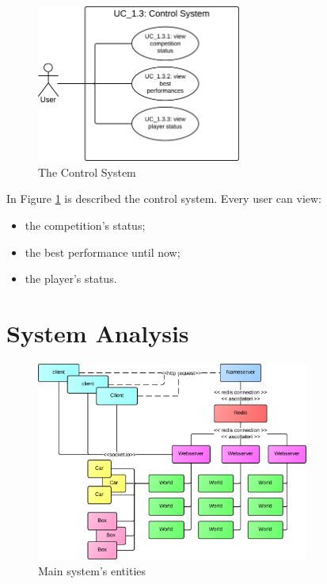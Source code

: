 \begin{figure}[H]
\centering %
\includegraphics[width=0.6\textwidth]{./img/UML/ControlSystem.png}
\caption{The Control System}
\label{fig:ControlSystem}
\end{figure}

In Figure \ref{fig:ControlSystem} is described the control system. Every user can view:
\begin{itemize}
\item the competition's status;
\item the best performance until now;
\item the player's status.
\end{itemize}

\section{System Analysis}

\begin{figure}[H]
\centering %
\includegraphics[width=0.8\textwidth]{./img/SystemAnalysis/Entities.png}
\caption{Main system's entities}
\label{fig:entities}
\end{figure}

